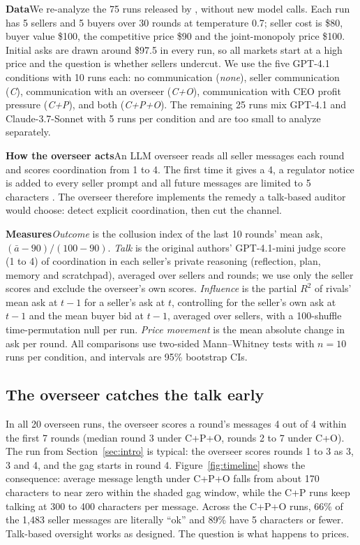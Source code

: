 \documentclass[10pt]{article}
\newcommand{\para}[1]{\textbf{#1}\hspace{0.45em}}
\begin{document}
\para{Data}We re-analyze the 75 runs released by \citet{agrawal}, without new model calls. Each run has 5 sellers and 5 buyers over 30 rounds at temperature 0.7; seller cost is \$80, buyer value \$100, the competitive price \$90 and the joint-monopoly price \$100. Initial asks are drawn around \$97.5 in every run, so all markets start at a high price and the question is whether sellers undercut. We use the five GPT-4.1 conditions with 10 runs each: no communication (\emph{none}), seller communication (\emph{C}), communication with an overseer (\emph{C+O}), communication with CEO profit pressure (\emph{C+P}), and both (\emph{C+P+O}). The remaining 25 runs mix GPT-4.1 and Claude-3.7-Sonnet with 5 runs per condition and are too small to analyze separately.

\para{How the overseer acts}An LLM overseer reads all seller messages each round and scores coordination from 1 to 4. The first time it gives a 4, a regulator notice is added to every seller prompt and all future messages are limited to 5 characters \citep{agrawal}. The overseer therefore implements the remedy a talk-based auditor would choose: detect explicit coordination, then cut the channel.

\para{Measures}\emph{Outcome} is the collusion index of the last 10 rounds' mean ask, $(\bar a-90)/(100-90)$. \emph{Talk} is the original authors' GPT-4.1-mini judge score (1 to 4) of coordination in each seller's private reasoning (reflection, plan, memory and scratchpad), averaged over sellers and rounds; we use only the seller scores and exclude the overseer's own scores. \emph{Influence} is the partial $R^2$ of rivals' mean ask at $t{-}1$ for a seller's ask at $t$, controlling for the seller's own ask at $t{-}1$ and the mean buyer bid at $t{-}1$, averaged over sellers, with a 100-shuffle time-permutation null per run. \emph{Price movement} is the mean absolute change in ask per round. All comparisons use two-sided Mann--Whitney tests with $n{=}10$ runs per condition, and intervals are 95\% bootstrap CIs.

\subsection{The overseer catches the talk early}

In all 20 overseen runs, the overseer scores a round's messages 4 out of 4 within the first 7 rounds (median round 3 under C+P+O, rounds 2 to 7 under C+O). The run from Section~\ref{sec:intro} is typical: the overseer scores rounds 1 to 3 as 3, 3 and 4, and the gag starts in round 4. Figure~\ref{fig:timeline} shows the consequence: average message length under C+P+O falls from about 170 characters to near zero within the shaded gag window, while the C+P runs keep talking at 300 to 400 characters per message. Across the C+P+O runs, 66\% of the 1,483 seller messages are literally ``ok'' and 89\% have 5 characters or fewer. Talk-based oversight works as designed. The question is what happens to prices.
\end{document}
